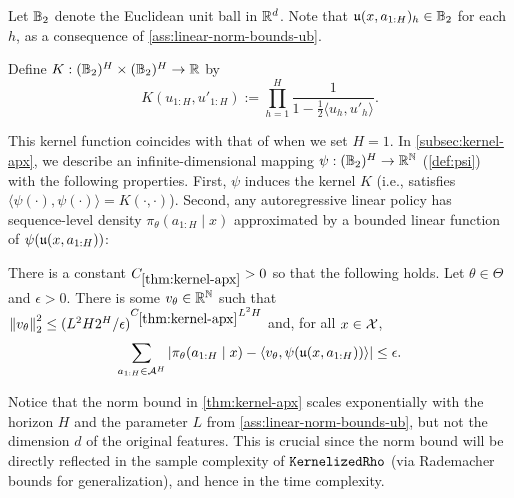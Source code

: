 Let $\mathbb{B}_2$ denote the Euclidean unit ball in $\mathbb{R}^d$. Note that $\mathfrak{u}(x,a_{1:H})_h \in \mathbb{B}_2$ for each $h$, as a consequence of \cref{ass:linear-norm-bounds-ub}.

\begin{definition} \label{def:kernel} Define $K: (\mathbb{B}_2)^H \times (\mathbb{B}_2)^H \to \mathbb{R}$ by  
\[K(u_{1:H},u'_{1:H}) := \prod_{h=1}^H \frac{1}{1 - \frac{1}{2} \langle u_h, u'_h\rangle}.\]
\end{definition}

This kernel function coincides with that of \cite{shalev2011learning} when we set $H = 1$. In \cref{subsec:kernel-apx}, we describe an infinite-dimensional mapping $\psi: (\mathbb{B}_2)^H \to \mathbb{R}^{\mathbb{N}}$ (\cref{def:psi}) with the following properties. First, $\psi$ induces the kernel $K$ (i.e., satisfies $\langle \psi(\cdot),\psi(\cdot)\rangle = K(\cdot,\cdot)$). Second, any autoregressive linear policy has sequence-level density $\pi_\theta(a_{1:H}\mid{} x)$ approximated by a bounded linear function of $\psi(\mathfrak{u}(x,a_{1:H}))$:

\begin{theorem}\label{thm:kernel-apx}
There is a constant $C_{\ref{thm:kernel-apx}}>0$ so that the following holds. Let $\theta \in \Theta$ and $\epsilon>0$. There is some $v_\theta \in \mathbb{R}^{\mathbb{N}}$ such that $\left \lVert v_\theta \right \rVert_2^2 \leq (L^2H2^H/\epsilon)^{C_{\ref{thm:kernel-apx}}L^2H}$ and, for all $x \in \mathcal{X}$,
\[\sum_{a_{1:H} \in \mathcal{A}^H} \left|\pi_\theta(a_{1:H}\mid{}x) - \langle v_\theta, \psi(\mathfrak{u}(x,a_{1:H}))\rangle\right| \leq \epsilon.\]
\end{theorem}

Notice that the norm bound in \cref{thm:kernel-apx} scales exponentially with the horizon $H$ and the parameter $L$ from \cref{ass:linear-norm-bounds-ub}, but not the dimension $d$ of the original features. This is crucial since the norm bound will be directly reflected in the sample complexity of $\texttt{KernelizedRho}$ (via Rademacher bounds for generalization), and hence in the time complexity.

